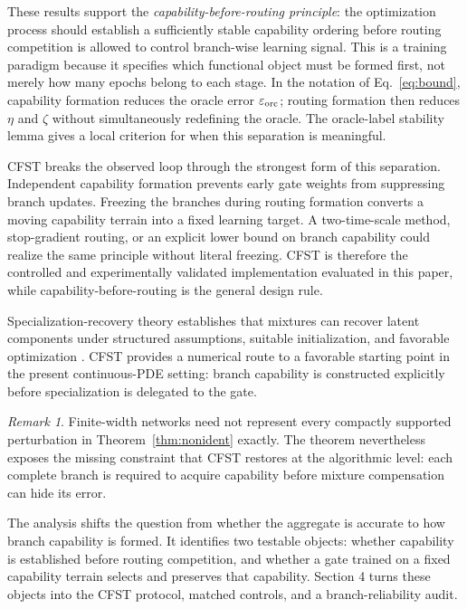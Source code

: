 \documentclass[preprint,12pt]{elsarticle}
\theoremstyle{remark}
\newtheorem{remark}{Remark}
\begin{document}
These results support the \emph{capability-before-routing principle}: the optimization process should establish a sufficiently stable capability ordering before routing competition is allowed to control branch-wise learning signal. This is a training paradigm because it specifies which functional object must be formed first, not merely how many epochs belong to each stage. In the notation of Eq.~\eqref{eq:bound}, capability formation reduces the oracle error $\varepsilon_{\rm orc}$; routing formation then reduces $\eta$ and $\zeta$ without simultaneously redefining the oracle. The oracle-label stability lemma gives a local criterion for when this separation is meaningful.

CFST breaks the observed loop through the strongest form of this separation. Independent capability formation prevents early gate weights from suppressing branch updates. Freezing the branches during routing formation converts a moving capability terrain into a fixed learning target. A two-time-scale method, stop-gradient routing, or an explicit lower bound on branch capability could realize the same principle without literal freezing. CFST is therefore the controlled and experimentally validated implementation evaluated in this paper, while capability-before-routing is the general design rule.

Specialization-recovery theory establishes that mixtures can recover latent components under structured assumptions, suitable initialization, and favorable optimization \cite{chen2022moe}. CFST provides a numerical route to a favorable starting point in the present continuous-PDE setting: branch capability is constructed explicitly before specialization is delegated to the gate.

\begin{remark}
Finite-width networks need not represent every compactly supported perturbation in Theorem~\ref{thm:nonident} exactly. The theorem nevertheless exposes the missing constraint that CFST restores at the algorithmic level: each complete branch is required to acquire capability before mixture compensation can hide its error.
\end{remark}

The analysis shifts the question from whether the aggregate is accurate to how branch capability is formed. It identifies two testable objects: whether capability is established before routing competition, and whether a gate trained on a fixed capability terrain selects and preserves that capability. Section 4 turns these objects into the CFST protocol, matched controls, and a branch-reliability audit.
\end{document}
